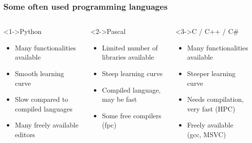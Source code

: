 \documentclass[11pt,table,final,fleqn,xcolor={usenames,dvipsnames},unknownkeysallowed]{beamer}
\begin{document}
\begin{frame}
 \frametitle{Some often used programming languages}
 \fontsize{7.2pt}{7.2}\selectfont
 \begin{columns}[T]
   \begin{block}<1->{Python}
     \begin{itemize}
       \item Many functionalities available
       \item Smooth learning curve
       \item Slow compared to compiled languages
       \item Many freely available editors
     \end{itemize}
   \end{block}
    \begin{block}<2->{Pascal}
     \begin{itemize}
       \item Limited number of libraries available
       \item Steep learning curve
       \item Compiled language, may be fast
       \item Some free compilers (fpc)
     \end{itemize}
   \end{block}
   \begin{block}<3->{C / C++ / C\#}
     \begin{itemize}
       \item Many functionalities available 
       \item Steeper learning curve
       \item Needs compilation, very fast (HPC)
       \item Freely available (gcc, MSVC)
     \end{itemize}
   \end{block}


\end{columns}
\end{frame}
\end{document}
